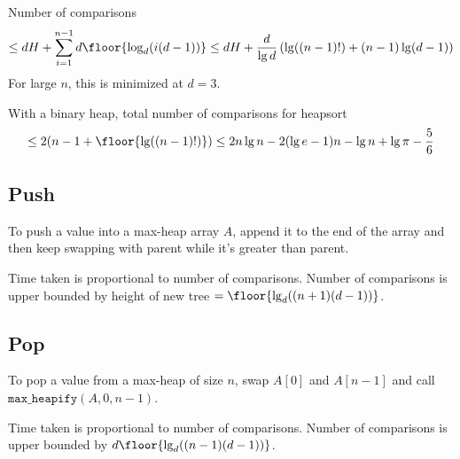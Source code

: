 Number of comparisons
\[ \le dH + \sum_{i=1}^{n-1} d\floor{\log_d (i(d-1))}
\le dH + \frac{d}{\lg d} \left(\lg((n-1)!) + (n-1)\lg(d-1)\right) \]
For large $n$, this is minimized at $d = 3$.

With a binary heap, total number of comparisons for heapsort
\[ \le 2(n-1 + \floor{\lg((n-1)!)}) \le 2n\lg n - 2(\lg e - 1)n - \lg n + \lg\pi - \frac{5}{6} \]

\subsection{Push}

To push a value into a max-heap array $A$, append it to the end of the array
and then keep swapping with parent while it's greater than parent.

Time taken is proportional to number of comparisons.
Number of comparisons is upper bounded by height of new tree
$= \floor{\lg_d((n+1)(d-1))}$.

\subsection{Pop}

To pop a value from a max-heap of size $n$, swap $A[0]$ and $A[n-1]$ and call
$\texttt{max\_heapify}(A, 0, n-1)$.

Time taken is proportional to number of comparisons.
Number of comparisons is upper bounded by $d\floor{\lg_d((n-1)(d-1))}$.


